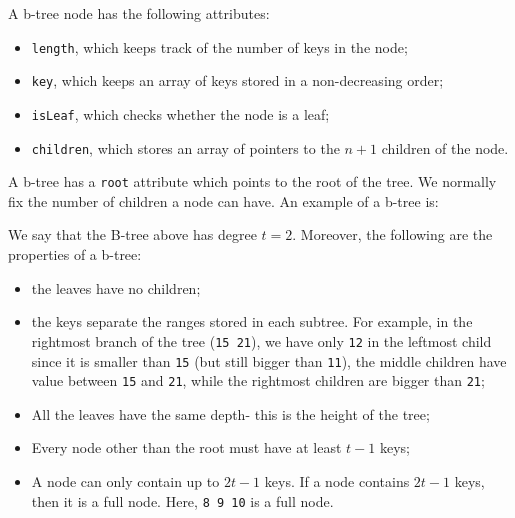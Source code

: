 \documentclass[a4paper, openany]{memoir}
\begin{document}
\noindent A b-tree node has the following attributes:
\begin{itemize}
    \item \texttt{length}, which keeps track of the number of keys in the node;
    \item \texttt{key}, which keeps an array of keys stored in a non-decreasing order;
    \item \texttt{isLeaf}, which checks whether the node is a leaf;
    \item \texttt{children}, which stores an array of pointers to the $n+1$ children of the node.
\end{itemize}
A b-tree has a \texttt{root} attribute which points to the root of the tree. We normally fix the number of children a node can have. An example of a b-tree is:
\begin{center}
\end{center}
We say that the B-tree above has degree $t = 2$. Moreover, the following are the properties of a b-tree:
\begin{itemize}
    \item the leaves have no children;
    \item the keys separate the ranges stored in each subtree. For example, in the rightmost branch of the tree (\texttt{15 21}), we have only \texttt{12} in the leftmost child since it is smaller than \texttt{15} (but still bigger than \texttt{11}), the middle children have value between \texttt{15} and \texttt{21}, while the rightmost children are bigger than \texttt{21};
    \item All the leaves have the same depth- this is the height of the tree;
    \item Every node other than the root must have at least $t - 1$ keys;
    \item A node can only contain up to $2t - 1$ keys. If a node contains $2t - 1$ keys, then it is a full node. Here, \texttt{8 9 10} is a full node.
\end{itemize}
\end{document}

